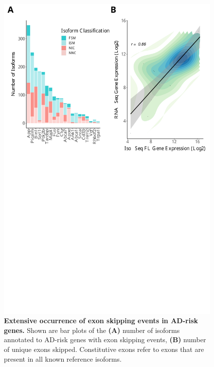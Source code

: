 \begin{figure}[]
	\centering
	\includegraphics[page=6,trim={0 20cm 0 0cm},clip,scale = 0.55]{Figures/ONTvsIsoSeq.pdf}
	\captionsetup{width=0.95\textwidth}
	\caption[Characterisation of exon skipping events in AD-risk genes]%
	{\textbf{Extensive occurrence of exon skipping events in AD-risk genes.} Shown are bar plots of the \textbf{(A)} number of isoforms annotated to AD-risk genes with exon skipping events, \textbf{(B)} number of unique exons skipped. Constitutive exons refer to exons that are present in all known reference isoforms.}
	\label{fig:ES_targeted}
\end{figure}

